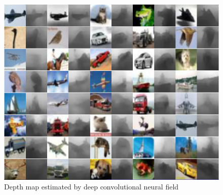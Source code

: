 \documentclass[10pt,twocolumn,letterpaper]{article}
\begin{document}
\begin{figure}
\includegraphics[width=\linewidth]{../tiny.png}
\caption{Depth map estimated by deep convolutional neural field}
\label{fig:tiny}
\end{figure}
\end{document}
